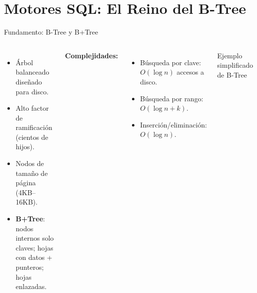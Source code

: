 \documentclass[aspectratio=169, 10pt, xcolor=table]{beamer}
\begin{document}
\section{Motores SQL: El Reino del B-Tree}

\begin{frame}{Fundamento: B-Tree y B+Tree}
    \begin{columns}
        \begin{itemize}
            \item Árbol balanceado diseñado para disco.
            \item Alto factor de ramificación (cientos de hijos).
            \item Nodos de tamaño de página (4KB–16KB).
            \item \textbf{B+Tree}: nodos internos solo claves; hojas con datos + punteros; hojas enlazadas.
        \end{itemize}
        \vspace{0.2cm}
        \textbf{Complejidades:}
        \begin{itemize}
            \item Búsqueda por clave: $O(\log n)$ accesos a disco.
            \item Búsqueda por rango: $O(\log n + k)$.
            \item Inserción/eliminación: $O(\log n)$.
        \end{itemize}
        \centering
        \vspace{0.2cm}
        {\tiny Ejemplo simplificado de B-Tree}
    \end{columns}
\end{frame}
\end{document}
